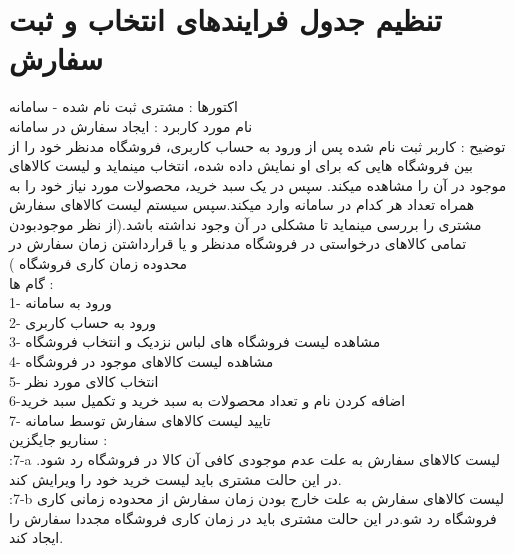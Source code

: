 \documentclass[12pt]{report}
\begin{document}
\section{تنظیم جدول فرایندهای انتخاب و ثبت سفارش}
اکتورها : مشتری ثبت نام شده - سامانه\\
نام مورد کاربرد : ایجاد سفارش در سامانه\\
توضیح : کاربر ثبت نام شده پس از ورود به حساب کاربری، فروشگاه مدنظر خود را از بین فروشگاه هایی که برای او نمایش داده شده، انتخاب مینماید و لیست کالاهای موجود در آن را مشاهده میکند. سپس در یک سبد خرید، محصولات مورد نیاز خود را به همراه تعداد هر کدام در سامانه وارد میکند.سپس سیستم لیست کالاهای سفارش مشتری را بررسی مینماید تا مشکلی در آن وجود نداشته باشد.(از نظر موجودبودن تمامی کالاهای درخواستی در فروشگاه مدنظر و یا قرارداشتن زمان سفارش در محدوده زمان کاری فروشگاه )\\
گام ها :\\
1- ورود به سامانه\\
2- ورود به حساب کاربری\\
3- مشاهده لیست فروشگاه های لباس نزدیک و انتخاب فروشگاه\\
4- مشاهده لیست کالاهای موجود در فروشگاه\\
5- انتخاب کالای مورد نظر\\
6-اضافه کردن نام و تعداد محصولات به سبد خرید و تکمیل سبد خرید\\
7- تایید لیست کالاهای سفارش توسط سامانه\\
سناریو جایگزین :\\
:7-a لیست کالاهای سفارش به علت عدم موجودی کافی آن کالا در فروشگاه رد شود. در این حالت  مشتری باید لیست خرید خود را ویرایش کند.\\
:7-b لیست کالاهای سفارش به علت خارج بودن زمان سفارش از محدوده زمانی کاری فروشگاه رد شو.در این حالت مشتری باید در زمان کاری فروشگاه مجددا سفارش را ایجاد کند.
 
\end{document}
